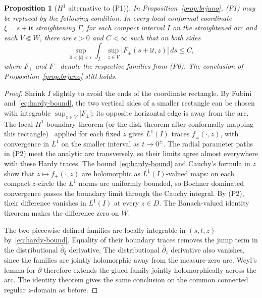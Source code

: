 \documentclass[11pt,a4paper]{article}
\newtheorem{proposition}[theorem]{Proposition}
\theoremstyle{definition}
\newcommand{\ii}{\mathrm{i}}
\begin{document}
\begin{proposition}[$H^1$ alternative to (P1)]
\label{prop:hardy-reduction}
In Proposition~\ref{prop:brjuno}, (P1) may be replaced by the following
condition.  In every local conformal coordinate $\xi=s+\ii t$ straightening
$\Gamma$, for each compact interval $I$ on the straightened arc and each
$V\Subset W$, there are $\epsilon>0$ and $C<\infty$ such that
on both sides
\begin{equation}\label{eq:hardy-bound}
 \sup_{0<|t|<\epsilon}\int_I
 \sup_{z\in V}|F_\pm(s+\ii t,z)|\,ds\le C,
\end{equation}
where $F_+$ and $F_-$ denote the respective families from (P0).
The conclusion of Proposition~\ref{prop:brjuno} still holds.
\end{proposition}

\begin{proof}
Shrink $I$ slightly to avoid the ends of the coordinate rectangle.
By Fubini and~\eqref{eq:hardy-bound}, the two vertical sides of a smaller
rectangle can be chosen with integrable $\sup_{z\in V}|F_\pm|$; its
opposite horizontal edge is away from the arc.  The local $H^1$ boundary theorem
(or the disk theorem after conformally mapping this rectangle)~\cite{Duren1970}
applied for each fixed $z$ gives
$L^1(I)$ traces $f_\pm(\cdot,z)$, with convergence in $L^1$ on the
smaller interval as $t\to0^\pm$.  The radial parameter paths in (P2)
meet the analytic arc transversely, so their limits agree almost everywhere
with these Hardy traces.  The bound~\eqref{eq:hardy-bound}
and Cauchy's formula in $z$ show that
$z\mapsto f_\pm(\cdot,z)$ are holomorphic as $L^1(I)$-valued maps:
on each compact $z$-circle the $L^1$ norms are uniformly bounded, so
Bochner dominated convergence passes the boundary limit through the
Cauchy integral.
By (P2), their difference vanishes in $L^1(I)$ at every $z\in D$.
The Banach-valued identity theorem makes the difference zero on $W$.

The two piecewise defined families are locally integrable in $(s,t,z)$
by~\eqref{eq:hardy-bound}.  Equality of their boundary traces removes
the jump term in the distributional $\bar\partial_\xi$ derivative.
The distributional $\bar\partial_z$ derivative also vanishes, since the
families are jointly holomorphic away from the measure-zero arc.
Weyl's lemma for $\bar\partial$ therefore extends the glued family
jointly holomorphically across the arc.  The identity theorem gives the
same conclusion on the common connected regular $z$-domain as before.
\end{proof}
\end{document}
